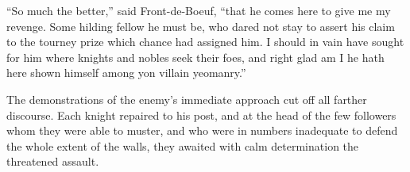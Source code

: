 ``So much the better,'' said Front-de-Boeuf, ``that he comes here to
give me my revenge. Some hilding fellow he must be, who dared not stay
to assert his claim to the tourney prize which chance had assigned him.
I should in vain have sought for him where knights and nobles seek their
foes, and right glad am I he hath here shown himself among yon villain
yeomanry.''

The demonstrations of the enemy's immediate approach cut off all farther
discourse. Each knight repaired to his post, and at the head of the few
followers whom they were able to muster, and who were in numbers
inadequate to defend the whole extent of the walls, they awaited with
calm determination the threatened assault.
